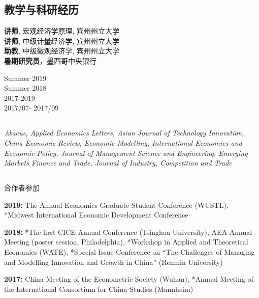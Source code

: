 \documentclass[letterpaper]{article}
\begin{document}
{\subsection*{\bf 教学与科研经历}
\begin{minipage}{0.8\linewidth}
  \textbf{讲师}, 宏观经济学原理, 宾州州立大学 \\
  \textbf{讲师}, 中级计量经济学, 宾州州立大学 \\
  \textbf{助教}, 中级微观经济学, 宾州州立大学 \\
  \textbf{暑期研究员}，墨西哥中央银行
\end{minipage}
\begin{minipage}{0.2\linewidth}
    Summer 2019 \\
    Summer 2018 \\
   2017-2019  \\
  2017/07- 2017/09
\end{minipage}

\subsection*{{}}
      \textit{Abacus, Applied Economics Letters, Asian Journal of Technology Innovation, China Economic Review, Economic Modelling, International Economics and Economic Policy, Journal of Management Science and Engineering, Emerging Markets Finance and Trade, Journal of Industry, Competition and Trade}

\subsection*{{}}
{\footnotesize * 合作者参加}
\vspace{1em}

\textbf{2019:} The  Annual Economics Graduate Student Conference (WUSTL), *Midwest International Economic Development Conference

\vspace{0.5em}
\textbf{2018:} *The first CICE Annual Conference (Tsinghua University), AEA Annual Meeting (poster session, Philadelphia), *Workshop in Applied and Theoretical Economics (WATE), *Special Issue Conference on “The Challenges of Managing and Modelling Innovation and Growth in China” (Renmin University)

\vspace{0.5em}
\textbf{2017:} China Meeting of the Econometric Society (Wuhan), *Annual Meeting of the International Consortium for China Studies (Mannheim)

}
\end{document}
